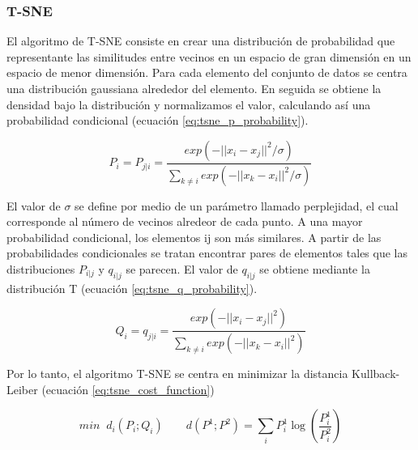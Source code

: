 \subsubsection{T-SNE \label{sec:tsne}}

El algoritmo de T-SNE consiste en crear una distribución de probabilidad que representante las similitudes entre vecinos en un espacio de gran dimensión en un espacio de menor dimensión. Para cada elemento del conjunto de datos se centra una distribución gaussiana alrededor del elemento. En seguida se obtiene la densidad bajo la distribución y normalizamos el valor, calculando así una probabilidad condicional (ecuación \ref{eq:tsne_p_probability}).

\begin{equation}
    P_i=P_{j|i} = \frac{exp(-||x_i-x_j||^2/\sigma)}{\sum\limits_{k\neq i} exp(-||x_k-x_i||^2/\sigma)} \label{eq:tsne_p_probability}
\end{equation}

El valor de $\sigma$ se define por medio de un parámetro llamado perplejidad, el cual corresponde al número de vecinos alredeor de cada punto. A una mayor probabilidad condicional, los elementos ij son más similares. A partir de las probabilidades condicionales se tratan encontrar pares de elementos tales que las distribuciones $P_{i|j}$ y $q_{i|j}$ se parecen. El valor de $q_{i|j}$ se obtiene mediante la distribución T (ecuación \ref{eq:tsne_q_probability}).

\begin{equation}
    Q_i=q_{j|i} = \frac{exp(-||x_i-x_j||^2)}{\sum\limits_{k\neq i} exp(-||x_k-x_i||^2)} \label{eq:tsne_q_probability}
\end{equation}

Por lo tanto, el algoritmo T-SNE se centra en minimizar la distancia Kullback-Leiber (ecuación \ref{eq:tsne_cost_function})

\begin{equation}
    min\;\; d_i (P_i;Q_i) \qquad d(P^1;P^2) = \sum_i P_i^1 \log \left(\frac{P^1_i}{P^2_i} \right)
    \label{eq:tsne_cost_function}
\end{equation}